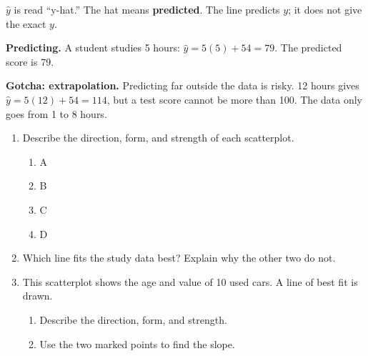 \documentclass[11pt]{article}
\begin{document}
\vspace{0.3em}
$\hat{y}$ is read ``y-hat.'' The hat means \textbf{predicted}. The line predicts $y$; it does not give the exact $y$.

\vspace{0.6em}
\textbf{Predicting.} A student studies 5 hours: \; $\hat{y} = 5(5) + 54 = 79$. \; The predicted score is 79.

\vspace{0.6em}
\textbf{Gotcha: extrapolation.} Predicting far outside the data is risky.
12 hours gives $\hat{y} = 5(12) + 54 = 114$, but a test score cannot be more than 100.
The data only goes from 1 to 8 hours.

\partner

\newpage
\begin{enumerate}

\item Describe the direction, form, and strength of each scatterplot.
\begin{center}\end{center}
\begin{enumerate}[itemsep=1.8em]
  \item A 
  \item B 
  \item C 
  \item D 
\end{enumerate}
\work{1.5em}

\item Which line fits the study data best? Explain why the other two do not.
\begin{center}\end{center}
\work{4em}

\newpage
\item This scatterplot shows the age and value of 10 used cars. A line of best fit is drawn.
\begin{center}\end{center}
\begin{enumerate}[itemsep=1em]
  \item Describe the direction, form, and strength. 
  \work{1.5em}
  \item Use the two marked points to find the slope.


\end{enumerate}
\end{enumerate}
\end{document}
